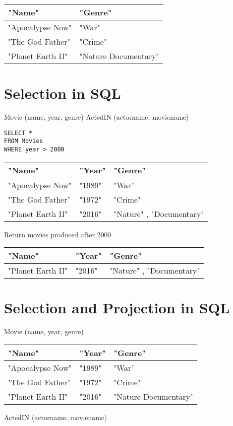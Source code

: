 \documentclass{article}
\begin{document}
\begin{tabular}{ll}
\hline
"Name" & "Genre" \\
\hline
"Apocalypse Now" & "War" \\
"The God Father" & "Crime" \\
"Planet Earth II" & "Nature Documentary" \\
\hline
\end{tabular}

\section*{Selection in SQL}
Movie (name, year, genre)
ActedIN (actorname, moviename)

\begin{verbatim}
SELECT *
FROM Movies
WHERE year > 2000
\end{verbatim}
\begin{tabular}{lll}
\hline
"Name" & "Year" & "Genre" \\
\hline
"Apocalypse Now" & "1989" & "War" \\
"The God Father" & "1972" & "Crime" \\
"Planet Earth II" & "2016" & "Nature" , "Documentary" \\
\hline
\end{tabular}

Return movies produced after 2000

\begin{tabular}{lll}
\hline
"Name" & "Year" & "Genre" \\
\hline
"Planet Earth II" & "2016" & "Nature" , "Documentary" \\
\hline
\end{tabular}

\section*{Selection and Projection in SQL}
Movie (name, year, genre)

\begin{tabular}{lll}
\hline
"Name" & "Year" & "Genre" \\
\hline
"Apocalypse Now" & "1989" & "War" \\
"The God Father" & "1972" & "Crime" \\
"Planet Earth II" & "2016" & "Nature Documentary" \\
\hline
\end{tabular}

ActedIN (actorname, moviename)
\end{document}
